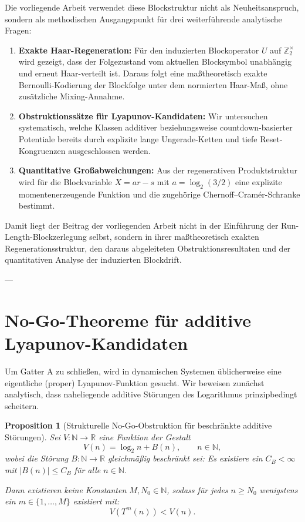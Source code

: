 \documentclass[11pt,reqno]{amsart}
\newtheorem{proposition}[theorem]{Proposition}
\theoremstyle{definition}
\theoremstyle{remark}
\numberwithin{equation}{section}
\begin{document}
Die vorliegende Arbeit verwendet diese Blockstruktur nicht als Neuheitsanspruch, sondern als methodischen Ausgangspunkt f\"ur drei weiterf\"uhrende analytische Fragen:
\begin{enumerate}
\item \textbf{Exakte Haar-Regeneration:} F\"ur den induzierten Blockoperator $U$ auf $\mathbb{Z}_2^\times$ wird gezeigt, dass der Folgezustand vom aktuellen Blocksymbol unabh\"angig und erneut Haar-verteilt ist. Daraus folgt eine ma\ss{}theoretisch exakte Bernoulli-Kodierung der Blockfolge unter dem normierten Haar-Ma\ss{}, ohne zus\"atzliche Mixing-Annahme.
\item \textbf{Obstruktionss\"atze f\"ur Lyapunov-Kandidaten:} Wir untersuchen systematisch, welche Klassen additiver beziehungsweise countdown-basierter Potentiale bereits durch explizite lange Ungerade-Ketten und tiefe Reset-Kongruenzen ausgeschlossen werden.
\item \textbf{Quantitative Gro\ss{}abweichungen:} Aus der regenerativen Produktstruktur wird f\"ur die Blockvariable $X = a r - s$ mit $a = \log_2(3/2)$ eine explizite momentenerzeugende Funktion und die zugeh\"orige Chernoff--Cram\'er-Schranke bestimmt.
\end{enumerate}

Damit liegt der Beitrag der vorliegenden Arbeit nicht in der Einf\"uhrung der Run-Length-Blockzerlegung selbst, sondern in ihrer ma\ss{}theoretisch exakten Regenerationsstruktur, den daraus abgeleiteten Obstruktionsresultaten und der quantitativen Analyse der induzierten Blockdrift.

---

\section{No-Go-Theoreme f\"ur additive Lyapunov-Kandidaten}

Um Gatter A zu schlie\ss{}en, wird in dynamischen Systemen \"ublicherweise eine eigentliche (proper) Lyapunov-Funktion gesucht. Wir beweisen zun\"achst analytisch, dass naheliegende additive St\"orungen des Logarithmus prinzipbedingt scheitern.

\begin{proposition}[Strukturelle No-Go-Obstruktion f\"ur beschr\"ankte additive St\"orungen]
\label{prop:nogo_lyapunov}
Sei $V: \mathbb{N} \to \mathbb{R}$ eine Funktion der Gestalt
\begin{equation}
V(n) = \log_2 n + B(n), \qquad n \in \mathbb{N},
\end{equation}
wobei die St\"orung $B: \mathbb{N} \to \mathbb{R}$ gleichm\"a\ss{}ig beschr\"ankt sei: Es existiere ein $C_B < \infty$ mit $|B(n)| \le C_B$ f\"ur alle $n \in \mathbb{N}$.

Dann existieren keine Konstanten $M, N_0 \in \mathbb{N}$, sodass f\"ur jedes $n \ge N_0$ wenigstens ein $m \in \{1, \dots, M\}$ existiert mit:
\begin{equation}
V(T^m(n)) < V(n).
\end{equation}
\end{proposition}
\end{document}
